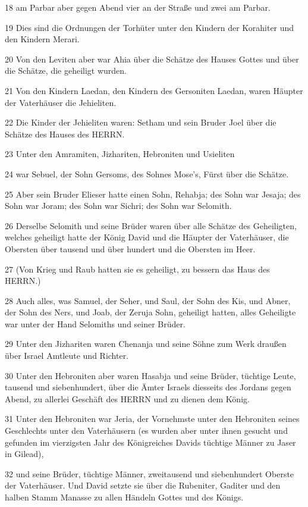 \par 18 am Parbar aber gegen Abend vier an der Straße und zwei am Parbar.
\par 19 Dies sind die Ordnungen der Torhüter unter den Kindern der Korahiter und den Kindern Merari.
\par 20 Von den Leviten aber war Ahia über die Schätze des Hauses Gottes und über die Schätze, die geheiligt wurden.
\par 21 Von den Kindern Laedan, den Kindern des Gersoniten Laedan, waren Häupter der Vaterhäuser die Jehieliten.
\par 22 Die Kinder der Jehieliten waren: Setham und sein Bruder Joel über die Schätze des Hauses des HERRN.
\par 23 Unter den Amramiten, Jizhariten, Hebroniten und Usieliten
\par 24 war Sebuel, der Sohn Gersoms, des Sohnes Mose's, Fürst über die Schätze.
\par 25 Aber sein Bruder Elieser hatte einen Sohn, Rehabja; des Sohn war Jesaja; des Sohn war Joram; des Sohn war Sichri; des Sohn war Selomith.
\par 26 Derselbe Selomith und seine Brüder waren über alle Schätze des Geheiligten, welches geheiligt hatte der König David und die Häupter der Vaterhäuser, die Obersten über tausend und über hundert und die Obersten im Heer.
\par 27 (Von Krieg und Raub hatten sie es geheiligt, zu bessern das Haus des HERRN.)
\par 28 Auch alles, was Samuel, der Seher, und Saul, der Sohn des Kis, und Abner, der Sohn des Ners, und Joab, der Zeruja Sohn, geheiligt hatten, alles Geheiligte war unter der Hand Selomiths und seiner Brüder.
\par 29 Unter den Jizhariten waren Chenanja und seine Söhne zum Werk draußen über Israel Amtleute und Richter.
\par 30 Unter den Hebroniten aber waren Hasabja und seine Brüder, tüchtige Leute, tausend und siebenhundert, über die Ämter Israels diesseits des Jordans gegen Abend, zu allerlei Geschäft des HERRN und zu dienen dem König.
\par 31 Unter den Hebroniten war Jeria, der Vornehmste unter den Hebroniten seines Geschlechts unter den Vaterhäusern (es wurden aber unter ihnen gesucht und gefunden im vierzigsten Jahr des Königreiches Davids tüchtige Männer zu Jaser in Gilead),
\par 32 und seine Brüder, tüchtige Männer, zweitausend und siebenhundert Oberste der Vaterhäuser. Und David setzte sie über die Rubeniter, Gaditer und den halben Stamm Manasse zu allen Händeln Gottes und des Königs.


